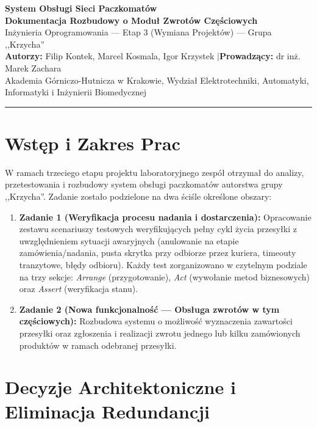 \documentclass[10.5pt,a4paper]{article}
\begin{document}
\begin{center}
    {\Large \textbf{\color{primary}System Obsługi Sieci Paczkomatów}}\\[0.15cm]
    {\large \textbf{Dokumentacja Rozbudowy o Moduł Zwrotów Częściowych}}\\[0.1cm]
    {\footnotesize Inżynieria Oprogramowania --- Etap 3 (Wymiana Projektów) --- Grupa ,,Krzycha''}\\[0.25cm]
    \small \textbf{Autorzy:} Filip Kontek, Marcel Kosmala, Igor Krzystek \quad$\vert$\quad \textbf{Prowadzący:} dr inż. Marek Zachara\\
    \footnotesize Akademia Górniczo-Hutnicza w Krakowie, Wydział Elektrotechniki, Automatyki, Informatyki i Inżynierii Biomedycznej
\end{center}

\vspace{-0.1cm}
\hrule
\vspace{0.25cm}

\section{Wstęp i Zakres Prac}

W ramach trzeciego etapu projektu laboratoryjnego zespół otrzymał do analizy, przetestowania i rozbudowy system obsługi paczkomatów autorstwa grupy ,,Krzycha''. Zadanie zostało podzielone na dwa ściśle określone obszary:
\begin{enumerate}[leftmargin=*,itemsep=1pt]
    \item \textbf{Zadanie 1 (Weryfikacja procesu nadania i dostarczenia):} Opracowanie zestawu scenariuszy testowych weryfikujących pełny cykl życia przesyłki z uwzględnieniem sytuacji awaryjnych (anulowanie na etapie zamówienia/nadania, pusta skrytka przy odbiorze przez kuriera, timeouty tranzytowe, błędy odbioru). Każdy test zorganizowano w czytelnym podziale na trzy sekcje: \textit{Arrange} (przygotowanie), \textit{Act} (wywołanie metod biznesowych) oraz \textit{Assert} (weryfikacja stanu).
    \item \textbf{Zadanie 2 (Nowa funkcjonalność --- Obsługa zwrotów w tym częściowych):} Rozbudowa systemu o możliwość wyznaczenia zawartości przesyłki oraz zgłoszenia i realizacji zwrotu jednego lub kilku zamówionych produktów w ramach odebranej przesyłki.
\end{enumerate}

\section{Decyzje Architektoniczne i Eliminacja Redundancji}
\end{document}
